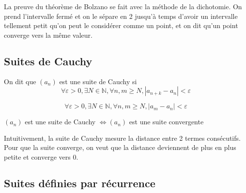 \documentclass{article}
\begin{document}
\begin{remark}
    La preuve du théorème de Bolzano se fait avec la méthode de la dichotomie.
    On prend l'intervalle fermé et on le sépare en 2 jusqu'à temps d'avoir un
    intervalle tellement petit qu'on peut le considérer comme un point, et
    on dit qu'un point converge vers la même valeur.
\end{remark}

\subsection{Suites de Cauchy}

\begin{definition}
    On dit que $(a_n)$ est une suite de Cauchy si
    $$ \forall \varepsilon > 0, \exists N \in \mathbb{N}, \forall n,m \geq N,
    |a_{n+k} - a_n| < \varepsilon$$
\end{definition}

\begin{remark}
    $$ \forall \varepsilon > 0, \exists N \in \mathbb{N}, \forall n,m \geq N,
    |a_m - a_n| < \varepsilon$$
\end{remark}

\begin{theorem}
    $(a_n)$ est une suite de Cauchy $\Longleftrightarrow (a_n)$ est une suite
    convergente
\end{theorem}

\begin{intuition}
    Intuitivement, la suite de Cauchy mesure la distance entre 2 termes
    consécutifs. Pour que la suite converge, on veut que la distance deviennent
    de plus en plus petite et converge vers 0.
\end{intuition}

\subsection{Suites définies par récurrence}

\begin{proposition}
\end{proposition}
\end{document}

